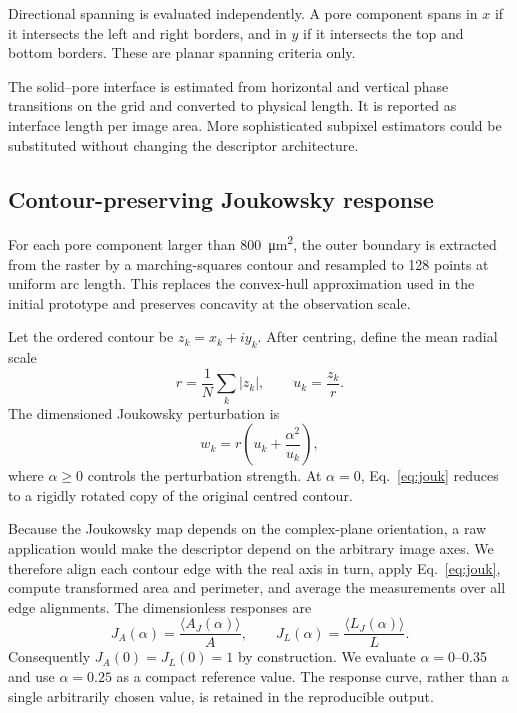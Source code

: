 \documentclass[preprint,12pt,authoryear]{elsarticle}
\begin{document}
Directional spanning is evaluated independently. A pore component spans in $x$ if it intersects the left and right borders, and in $y$ if it intersects the top and bottom borders. These are planar spanning criteria only.

The solid--pore interface is estimated from horizontal and vertical phase transitions on the grid and converted to physical length. It is reported as interface length per image area. More sophisticated subpixel estimators could be substituted without changing the descriptor architecture.

\subsection{Contour-preserving Joukowsky response}

For each pore component larger than \SI{800}{\micro m^2}, the outer boundary is extracted from the raster by a marching-squares contour and resampled to 128 points at uniform arc length. This replaces the convex-hull approximation used in the initial prototype and preserves concavity at the observation scale.

Let the ordered contour be $z_k=x_k+i y_k$. After centring, define the mean radial scale
\begin{equation}
r=\frac{1}{N}\sum_k |z_k|,
\qquad
u_k=\frac{z_k}{r}.
\end{equation}
The dimensioned Joukowsky perturbation is
\begin{equation}
w_k=r\left(u_k+\frac{\alpha^2}{u_k}\right),
\label{eq:jouk}
\end{equation}
where $\alpha\ge0$ controls the perturbation strength. At $\alpha=0$, Eq.~\ref{eq:jouk} reduces to a rigidly rotated copy of the original centred contour.

Because the Joukowsky map depends on the complex-plane orientation, a raw application would make the descriptor depend on the arbitrary image axes. We therefore align each contour edge with the real axis in turn, apply Eq.~\ref{eq:jouk}, compute transformed area and perimeter, and average the measurements over all edge alignments. The dimensionless responses are
\begin{equation}
J_A(\alpha)=\frac{\langle A_J(\alpha)\rangle}{A},
\qquad
J_L(\alpha)=\frac{\langle L_J(\alpha)\rangle}{L}.
\end{equation}
Consequently $J_A(0)=J_L(0)=1$ by construction. We evaluate $\alpha=0$--0.35 and use $\alpha=0.25$ as a compact reference value. The response curve, rather than a single arbitrarily chosen value, is retained in the reproducible output.
\end{document}
